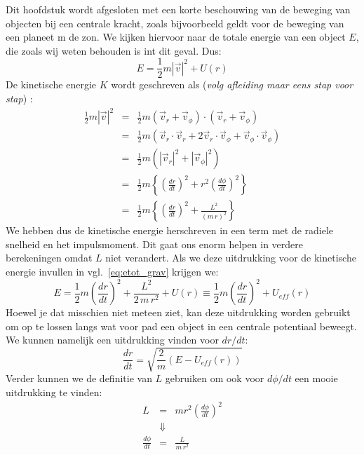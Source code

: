 Dit hoofdstuk wordt afgesloten met een korte beschouwing van de beweging van objecten bij een centrale kracht,
zoals bijvoorbeeld geldt voor de beweging van een planeet m de zon. We kijken hiervoor naar de totale energie
van een object $E$, die zoals wij weten behouden is int dit geval. Dus:
\begin{equation}\label{eq:etot_grav}
E = \frac{1}{2}m|\vec{v}|^2 + U(r)
\end{equation}
De kinetische energie $K$ wordt geschreven als (\emph{volg afleiding maar eens stap voor stap}) :
\begin{eqnarray}
\frac{1}{2} m|\vec{v}|^2 & = & \frac{1}{2}m (\vec{v}_{r}+\vec{v}_{\phi})\cdot(\vec{v}_{r}+\vec{v}_{\phi}) \\
& = & \frac{1}{2}m (\vec{v}_r\cdot\vec{v}_r + 2 \vec{v}_r\cdot\vec{v}_{\phi} + \vec{v}_{\phi}\cdot\vec{v}_{\phi}) \\ 
& = & \frac{1}{2}m (|\vec{v}_r|^2 + |\vec{v}_{\phi}|^2) \\
& = & \frac{1}{2}m\left\{\left(\frac{dr}{dt}\right)^2+r^2\left(\frac{d\phi}{dt}\right)^2\right\} \\
& = & \frac{1}{2}m\left\{\left(\frac{dr}{dt}\right)^2+\frac{L^2}{(m\,r)^2}\right\}
\end{eqnarray}
We hebben dus de kinetische energie herschreven in een term met de radiele snelheid en het impulsmoment. Dit
gaat ons enorm helpen in verdere berekeningen omdat $L$ niet verandert. Als we deze uitdrukking voor de
kinetische energie invullen in vgl.~\ref{eq:etot_grav} krijgen we:
\begin{equation}
E = \frac{1}{2} m\left(\frac{dr}{dt}\right)^2+\frac{L^2}{2\,m\,r^2} + U(r) \equiv \frac{1}{2} m\left(\frac{dr}{dt}\right)^2 + U_{eff}(r)
\end{equation}
Hoewel je dat misschien niet meteen ziet, kan deze uitdrukking worden gebruikt om op te lossen langs wat voor 
pad een object in een centrale potentiaal beweegt. We kunnen namelijk een uitdrukking vinden voor $dr/dt$:
\begin{equation}
\frac{dr}{dt} = \sqrt{\frac{2}{m}\left(E-U_{eff}(r)\right)}
\end{equation}
Verder kunnen we de definitie van $L$ gebruiken om ook voor $d\phi / dt$ een mooie uitdrukking te vinden:
\begin{eqnarray}
L & = & m r^2 \left(\frac{d\phi}{dt}\right)^2 \\
& \Downarrow & \\
\frac{d\phi}{dt} & = & \frac{L}{m\,r^2}
\end{eqnarray}

